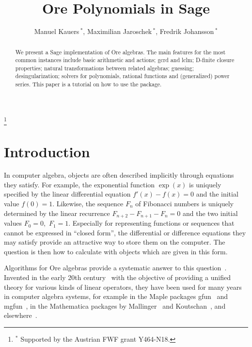 \documentclass{amsart}
\begin{document}
 \author[Manuel Kauers, Maximilian Jaroschek, Fredrik Johansson]
   {Manuel Kauers\,$^\ast$, Maximilian Jaroschek\,$^\ast$, Fredrik Johansson\,$^\ast$}
 \address{Manuel Kauers, Research Institute for Symbolic Computation (RISC), J. Kepler University Linz, Austria}
 \address{Maximilian Jaroschek, Research Institute for Symbolic Computation (RISC), J. Kepler University Linz, Austria}
 \address{Fredrik Johansson, Research Institute for Symbolic Computation (RISC), J. Kepler University Linz, Austria}
 \thanks{$^\ast$ Supported by the Austrian FWF grant Y464-N18.}

 \title{Ore Polynomials in Sage}

 \begin{abstract}
We present a Sage implementation of Ore algebras. The main features for the most
common instances include basic arithmetic and actions; gcrd and lclm; D-finite
closure properties; natural transformations between related algebras; guessing;
desingularization; solvers for polynomials, rational functions and (generalized)
power series. This paper is a tutorial on how to use the package.
 \end{abstract}

 \maketitle


\section{Introduction}

In computer algebra, objects are often described implicitly through equations
they satisfy. For example, the exponential function $\exp(x)$ is uniquely
specified by the linear differential equation $f'(x)-f(x)=0$ and the initial
value $f(0)=1$.  Likewise, the sequence $F_n$ of Fibonacci numbers is uniquely
determined by the linear recurrence $F_{n+2}-F_{n+1}-F_n=0$ and the two initial
values $F_0=0$,~$F_1=1$.  Especially for representing functions or sequences
that cannot be expressed in ``closed form'', the differential or difference
equations they may satisfy provide an attractive way to store them on the
computer. The question is then how to calculate with objects which are given in
this form.

Algorithms for Ore algebras provide a systematic answer to this
question~\cite{..,..}.  Invented in the early 20th century~\cite{..} with the
objective of providing a unified theory for various kinds of linear operators,
they have been used for many years in computer algebra systems, for example in
the Maple packages gfun~\cite{..} and mgfun~\cite{..}, in the Mathematica
packages by Mallinger~\cite{..} and Koutschan~\cite{..,..}, and
elsewhere~\cite{..}. 
\end{document}
